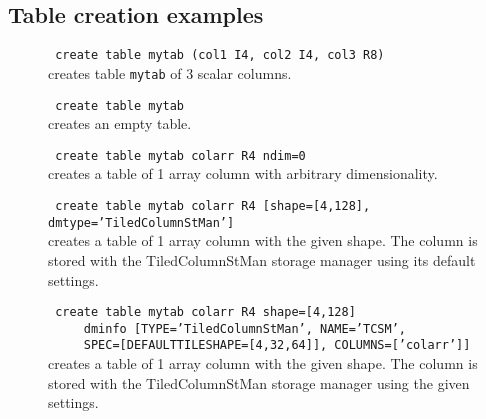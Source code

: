 \subsection{\label{TAQL:CREAEXAMPLES}Table creation examples}
\begin{description}
  \item[] \texttt{ create table mytab (col1 I4, col2 I4, col3 R8) }
      \\creates table \texttt{mytab} of 3 scalar columns.

  \item[] \texttt{ create table mytab }
      \\creates an empty table.

  \item[] \texttt{ create table mytab colarr R4 ndim=0 }
      \\creates a table of 1 array column with arbitrary dimensionality.

  \item[] \texttt{ create table mytab colarr R4 [shape=[4,128],
      dmtype='TiledColumnStMan'] }
      \\creates a table of 1 array column with the given shape.
        The column is stored with the TiledColumnStMan storage manager
        using its default settings.

  \item[] \texttt{ create table mytab colarr R4 shape=[4,128] }
     \\\verb=    =
     \texttt{   dminfo [TYPE='TiledColumnStMan', NAME='TCSM', }
     \\\verb=    =
     \texttt{           SPEC=[DEFAULTTILESHAPE=[4,32,64]], COLUMNS=['colarr']]}
      \\creates a table of 1 array column with the given shape.
        The column is stored with the TiledColumnStMan storage manager
        using the given settings.
\end{description}

